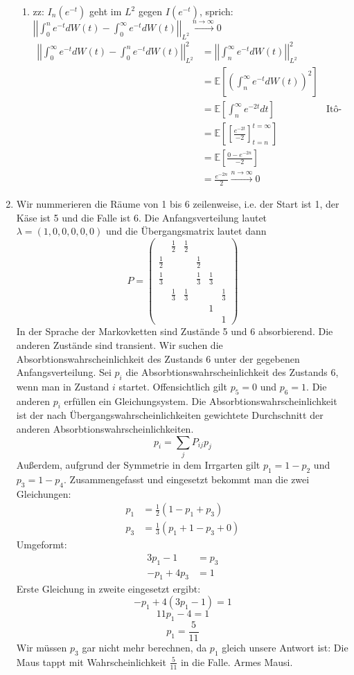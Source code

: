 \documentclass[a4paper,11pt,notitlepage,fullpage]{article}
\newcommand{\Ee}[1]{\mathbb E\left[#1\right]}
\newcommand{\norm}[2]{\left|\left|{#1}\right|\right|_{#2}}
\begin{document}
\begin{enumerate}
\begin{enumerate}
\item zz: $I_n (e^{-t})$ geht im $L^2$ gegen $I(e^{-t})$, sprich: $ \norm{\int_0^n e^{-t} dW(t) - \int_0^\infty e^{-t} dW(t)}{L^2} \stackrel{n\rightarrow\infty}{\rightarrow} 0$
\begin{align*}
\norm{\int_0^\infty e^{-t} dW(t) - \int_0^n e^{-t} dW(t)}{L^2}^2 &= \norm{\int_n^\infty e^{-t} dW(t)}{L^2}^2\\
&= \Ee{\left(\int_n^\infty e^{-t} dW(t)\right)^2}\\
&= \Ee{\int_n^\infty e^{-2t} dt} &\text{Itô-Iso}\\
&= \Ee{\left[ \frac{e^{-2t}}{-2} \right]_{t=n}^{t=\infty}}\\
&= \Ee{ \frac{0 - e^{-2n}}{-2}}\\
&= \frac{e^{-2n}}{2} \stackrel{n\rightarrow\infty}{\rightarrow} 0
\end{align*}
\end{enumerate}

\item Wir nummerieren die Räume von 1 bis 6 zeilenweise, i.e. der Start ist 1, der Käse ist 5 und die Falle ist 6. Die Anfangsverteilung lautet $\lambda = (1,0,0,0,0,0)$ und die Übergangsmatrix lautet dann
$$P = \begin{pmatrix}
&\frac{1}{2}&\frac{1}{2}&&& \\
\frac{1}{2}&&&\frac{1}{2}&& \\
\frac{1}{3}&&&\frac{1}{3}&\frac{1}{3}& \\
&\frac{1}{3}&\frac{1}{3}&&&\frac{1}{3} \\
&&&&1& \\
&&&&&1 
\end{pmatrix}$$
In der Sprache der Markovketten sind Zustände 5 und 6 absorbierend. Die anderen Zustände sind transient. Wir suchen die Absorbtionswahrscheinlichkeit des Zustands 6 unter der gegebenen Anfangsverteilung.
Sei $p_i$ die Absorbtionswahrscheinlichkeit des Zustands 6, wenn man in Zustand $i$ startet. Offensichtlich gilt $p_5 = 0$ und $p_6 = 1$. Die anderen $p_i$ erfüllen ein Gleichungsystem. Die Absorbtionswahrscheinlichkeit ist der nach Übergangswahrscheinlichkeiten gewichtete Durchschnitt der anderen Absorbtionswahrscheinlichkeiten.
$$p_i = \sum_j P_{ij} p_j$$
Außerdem, aufgrund der Symmetrie in dem Irrgarten gilt $p_1 = 1 - p_2$ und $p_3 = 1-p_4$. Zusammengefasst und eingesetzt bekommt man die zwei Gleichungen:
\begin{align*}
p_1 &= \frac{1}{2}(1 - p_1 + p_3) \\
p_3 &= \frac{1}{3}(p_1 + 1 - p_3 + 0)
\end{align*}
Umgeformt:
\begin{align*}
3 p_1 - 1&= p_3 \\
- p_1 + 4 p_3 &= 1
\end{align*}
Erste Gleichung in zweite eingesetzt ergibt:
$$- p_1 + 4 (3 p_1 - 1) = 1$$
$$11 p_1 - 4 = 1$$
$$p_1 = \frac{5}{11}$$
Wir müssen $p_3$ gar nicht mehr berechnen, da $p_1$ gleich unsere Antwort ist: Die Maus tappt mit Wahrscheinlichkeit $\frac{5}{11}$ in die Falle. Armes Mausi.


\end{enumerate}
\end{document}
